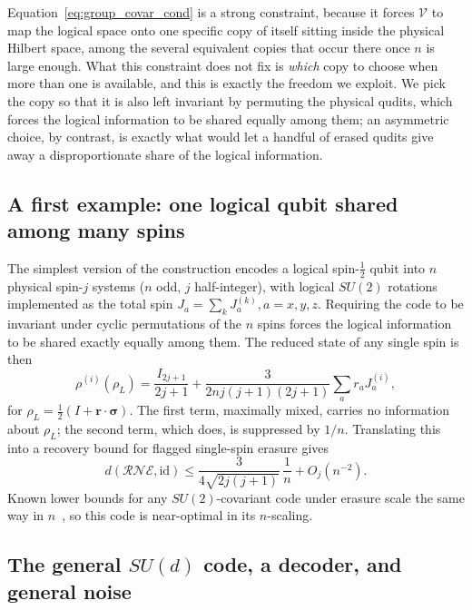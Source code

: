 \documentclass[10pt,twocolumn,superscriptaddress,aps,amsmath,amssymb,citeautoscript,floatfix,prx]{revtex4-2}
\theoremstyle{plain}
\theoremstyle{plain}
\theoremstyle{plain}
\theoremstyle{plain}
\theoremstyle{plain}
\theoremstyle{plain}
\theoremstyle{plain}
\theoremstyle{definition}
\theoremstyle{plain}
\begin{document}
Equation~\eqref{eq:group_covar_cond} is a strong constraint, because it forces $\mathcal{V}$ to map the logical space onto one specific copy of itself sitting inside the physical Hilbert space, among the several equivalent copies that occur there once $n$ is large enough. 
What this constraint does not fix is \emph{which} copy to choose when more than one is available, and this is exactly the freedom we exploit. We pick the copy so that it is also left invariant by permuting the physical qudits, which forces the logical information to be shared equally among them; an asymmetric choice, 
by contrast, is exactly what would let a handful of erased qudits give away a disproportionate share of the logical information.
 
\subsection{A first example: one logical qubit shared among many spins}\label{subsec:summary_su2}
 
The simplest version of the construction encodes a logical spin-$\tfrac12$ qubit into $n$ physical spin-$j$ systems ($n$ odd, $j$ half-integer), with logical $SU(2)$ rotations implemented as the total spin $J_a=\sum_k J_a^{(k)}, a=x, y, z$. 
Requiring the code to be invariant under cyclic permutations of the $n$ spins forces the logical information to be shared exactly equally among them. The reduced state of any single spin is then
$$
\rho^{(i)}(\rho_L)=\frac{I_{2j+1}}{2j+1}+\frac{3}{2nj(j+1)(2j+1)}\sum_a r_aJ_a^{(i)},
$$
for $\rho_L=\tfrac12(I+\mathbf r\cdot\boldsymbol\sigma)$. The first term, maximally mixed, carries no information about $\rho_L$; the second term, which does, is suppressed by $1/n$. 
Translating this into a recovery bound for flagged single-spin erasure gives
$$
d(\mathcal R\mathcal N\mathcal E,\mathrm{id})\le \frac{3}{4\sqrt{2j(j+1)}}\,\frac1n+O_{j}(n^{-2}).
$$
Known lower bounds for any $SU(2)$-covariant code under erasure scale the same way in $n$~\cite{Faist2020}, so this code is near-optimal in its $n$-scaling.
 
\subsection{The general \texorpdfstring{$SU(d)$}{SU(d)} code, a decoder, and general noise}\label{subsec:summary_sud}
 
\end{document}

